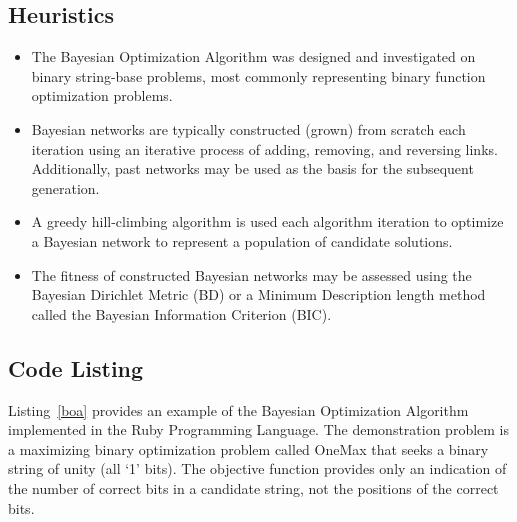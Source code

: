 \subsection{Heuristics}
\begin{itemize}
	\item The Bayesian Optimization Algorithm was designed and investigated on binary string-base problems, most commonly representing binary function optimization problems.
	\item Bayesian networks are typically constructed (grown) from scratch each iteration using an iterative process of adding, removing, and reversing links. Additionally, past networks may be used as the basis for the subsequent generation.
	\item A greedy hill-climbing algorithm is used each algorithm iteration to optimize a Bayesian network to represent a population of candidate solutions.
	\item The fitness of constructed Bayesian networks may be assessed using the Bayesian Dirichlet Metric (BD) or a Minimum Description length method called the Bayesian Information Criterion (BIC).
	
\end{itemize}

\subsection{Code Listing}
 Listing~\ref{boa} provides an example of the Bayesian Optimization Algorithm implemented in the Ruby Programming Language. 
The demonstration problem is a maximizing binary optimization problem called OneMax that seeks a binary string of unity (all `1' bits). The objective function provides only an indication of the number of correct bits in a candidate string, not the positions of the correct bits.
 
